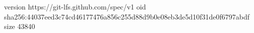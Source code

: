 version https://git-lfs.github.com/spec/v1
oid sha256:44037eed3c74cd46177476a856c255d88d9b0e08eb3de5d10f31de0f6797abdf
size 43840
